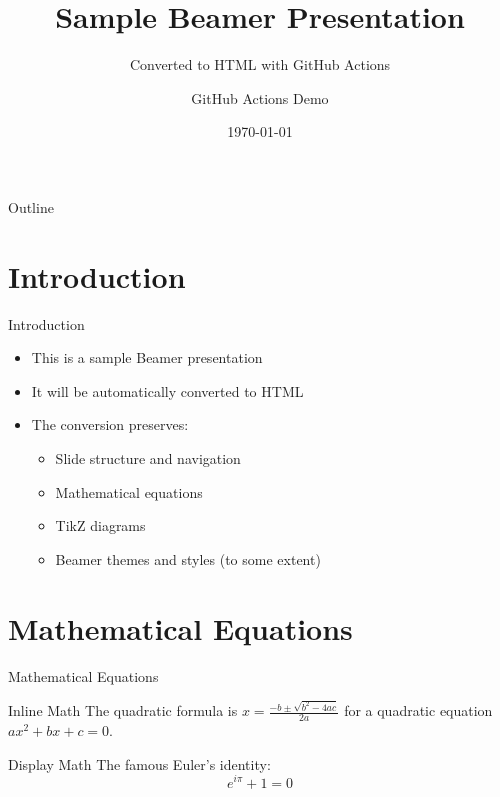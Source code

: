 \documentclass{beamer}
\title{Sample Beamer Presentation}
\subtitle{Converted to HTML with GitHub Actions}
\author{GitHub Actions Demo}
\institute{LaTeX to HTML Converter}
\date{\today}
\begin{document}
\begin{frame}
  \titlepage
\end{frame}

\begin{frame}{Outline}
  \tableofcontents
\end{frame}

\section{Introduction}

\begin{frame}{Introduction}
  \begin{itemize}
    \item This is a sample Beamer presentation
    \item It will be automatically converted to HTML
    \item The conversion preserves:
      \begin{itemize}
        \item Slide structure and navigation
        \item Mathematical equations
        \item TikZ diagrams
        \item Beamer themes and styles (to some extent)
      \end{itemize}
  \end{itemize}
\end{frame}

\section{Mathematical Equations}

\begin{frame}{Mathematical Equations}
  \begin{block}{Inline Math}
    The quadratic formula is $x = \frac{-b \pm \sqrt{b^2 - 4ac}}{2a}$ for a quadratic equation $ax^2 + bx + c = 0$.
  \end{block}
  
  \begin{block}{Display Math}
    The famous Euler's identity:
    \begin{equation}
      e^{i\pi} + 1 = 0
    \end{equation}
  \end{block}
\end{frame}
\end{document}
